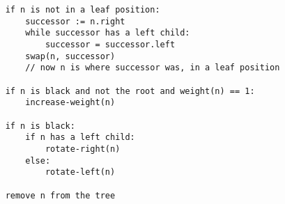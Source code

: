 \documentclass{article}
\begin{document}
\begin{small}
\begin{verbatim}
    if n is not in a leaf position:
        successor := n.right
        while successor has a left child:
            successor = successor.left
        swap(n, successor)
        // now n is where successor was, in a leaf position

    if n is black and not the root and weight(n) == 1:
        increase-weight(n)

    if n is black:
        if n has a left child:
            rotate-right(n)
        else:
            rotate-left(n)

    remove n from the tree

\end{verbatim}
\end{small}
\end{document}
